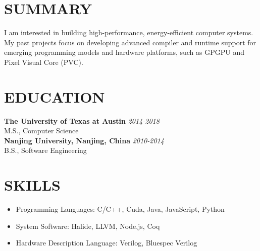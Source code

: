 \documentclass[margin, 9pt]{res} %
\begin{document}
\begin{resume}


\vspace*{-5pt}
\section{SUMMARY} 

I am interested in building high-performance, energy-efficient computer systems. My past projects focus on developing advanced compiler and runtime support for emerging programming models and hardware platforms, such as GPGPU and Pixel Visual Core (PVC).


\section{EDUCATION}

\textbf{The University of Texas at Austin} \hfill\textit{2014-2018}\\
M.S., Computer Science\\

\vspace*{-5pt}
\textbf{Nanjing University, Nanjing, China} \hfill\textit{2010-2014}\\
B.S., Software Engineering

 
\section{SKILLS}

\vspace*{-1pt}
\begin{itemize}[leftmargin=*] \itemsep -4pt
	\item Programming Languages: C/C++, Cuda, Java, JavaScript, Python
	\item System Software: Halide, LLVM, Node.js, Coq
	\item Hardware Description Language: Verilog, Bluespec Verilog
\end{itemize}


\end{resume}
\end{document}
